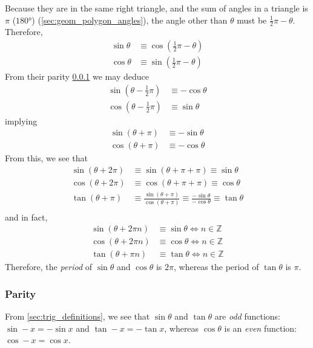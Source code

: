 \documentclass[fleqn,a4paper,11pt]{article}
\begin{document}
    Because they are in the same right triangle, and the sum of angles in a
    triangle is \(\pi\) (\(\ang{180}\)) (\ref{sec:geom_polygon_angles}), the angle
    other than \(\theta\) must be \(\frac 12 \pi - \theta\). Therefore,
    \begin{align}
    \sin \theta &\equiv \cos(\frac 12 \pi - \theta) \\
    \cos \theta &\equiv \sin(\frac 12 \pi - \theta)
    \end{align}
    From their parity \ref{sec:trig_parity} we may deduce
    \begin{align}
    \sin(\theta - \frac 12 \pi) &\equiv -\cos \theta \\
    \cos(\theta - \frac 12 \pi) &\equiv \sin \theta
    \end{align}
    implying
    \begin{align}
    \sin(\theta + \pi) &\equiv -\sin \theta \\
    \cos(\theta + \pi) &\equiv -\cos \theta
    \end{align}
    From this, we see that
    \begin{align}
    \sin(\theta + 2\pi) &\equiv \sin(\theta + \pi + \pi) \equiv \sin \theta \\
    \cos(\theta + 2\pi) &\equiv \cos(\theta + \pi + \pi) \equiv \cos \theta \\
    \tan(\theta + \pi) &\equiv \frac{\sin(\theta + \pi)}{\cos(\theta + \pi)}
        \equiv \frac{-\sin \theta}{-\cos \theta} \equiv \tan \theta \\
    \end{align}
    and in fact,
    \begin{align}
    \sin(\theta + 2\pi n) &\equiv \sin \theta \iff n \in \mathbb Z \\
    \cos(\theta + 2\pi n) &\equiv \cos \theta \iff n \in \mathbb Z \\
    \tan(\theta + \pi n) &\equiv \tan \theta \iff n \in \mathbb Z
    \end{align}
    Therefore, the \emph{period} of \(\sin \theta\) and \(\cos \theta\) is \(2\pi\),
    whereas the period of \(\tan \theta\) is \(\pi\).

    \subsubsection{Parity} \label{sec:trig_parity}

    From \ref{sec:trig_definitions}, we see that \(\sin \theta\) and \(\tan \theta\)
    are \emph{odd} functions:
    \(\sin -x = -\sin x\) and \(\tan -x = -\tan x\),
    whereas \(\cos \theta\) is an \emph{even} function:
    \(\cos -x = \cos x\).
\end{document}
